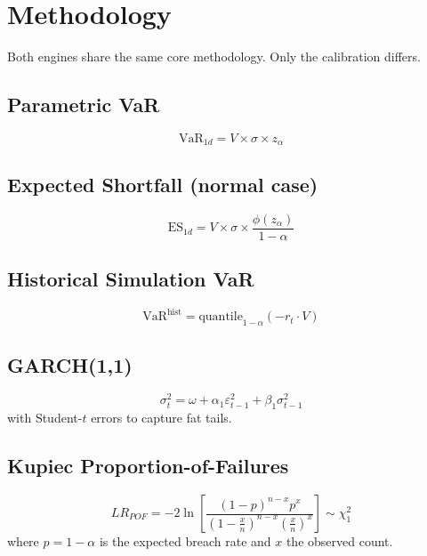 \documentclass[11pt,a4paper]{article}
\begin{document}
\section{Methodology}

Both engines share the same core methodology. Only the calibration differs.

\subsection{Parametric VaR}
\begin{equation}
\text{VaR}_{1d} = V \times \sigma \times z_{\alpha}
\end{equation}

\subsection{Expected Shortfall (normal case)}
\begin{equation}
\text{ES}_{1d} = V \times \sigma \times \frac{\phi(z_{\alpha})}{1-\alpha}
\end{equation}

\subsection{Historical Simulation VaR}
\begin{equation}
\text{VaR}^{\text{hist}} = \text{quantile}_{1-\alpha}\!\left(-r_t \cdot V\right)
\end{equation}

\subsection{GARCH(1,1)}
\begin{equation}
\sigma_t^2 = \omega + \alpha_1 \varepsilon_{t-1}^2 + \beta_1 \sigma_{t-1}^2
\end{equation}
with Student-\(t\) errors to capture fat tails.

\subsection{Kupiec Proportion-of-Failures}
\begin{equation}
LR_{POF} = -2 \ln\!\left[
\frac{(1-p)^{n-x} p^{x}}
     {\left(1-\tfrac{x}{n}\right)^{n-x} \left(\tfrac{x}{n}\right)^{x}}
\right] \sim \chi^2_1
\end{equation}
where \(p = 1-\alpha\) is the expected breach rate and \(x\) the observed count.
\end{document}
